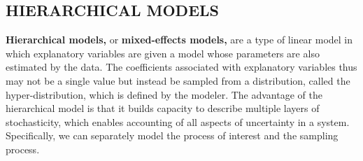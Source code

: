 \documentclass[]{article}
\newenvironment{Shaded}{\begin{snugshade}}{\end{snugshade}}
\newcommand{\KeywordTok}[1]{\textcolor[rgb]{0.13,0.29,0.53}{\textbf{#1}}}
\newcommand{\DataTypeTok}[1]{\textcolor[rgb]{0.13,0.29,0.53}{#1}}
\newcommand{\DecValTok}[1]{\textcolor[rgb]{0.00,0.00,0.81}{#1}}
\newcommand{\StringTok}[1]{\textcolor[rgb]{0.31,0.60,0.02}{#1}}
\newcommand{\CommentTok}[1]{\textcolor[rgb]{0.56,0.35,0.01}{\textit{#1}}}
\newcommand{\OperatorTok}[1]{\textcolor[rgb]{0.81,0.36,0.00}{\textbf{#1}}}
\newcommand{\NormalTok}[1]{#1}
\begin{document}
\begin{Shaded}
\end{Shaded}

\subsection{HIERARCHICAL MODELS}\label{hierarchical-models}

\textbf{Hierarchical models,} or \textbf{mixed-effects models,} are a
type of linear model in which explanatory variables are given a model
whose parameters are also estimated by the data. The coefficients
associated with explanatory variables thus may not be a single value but
instead be sampled from a distribution, called the hyper-distribution,
which is defined by the modeler. The advantage of the hierarchical model
is that it builds capacity to describe multiple layers of stochasticity,
which enables accounting of all aspects of uncertainty in a system.
Specifically, we can separately model the process of interest and the
sampling process.
\end{document}
